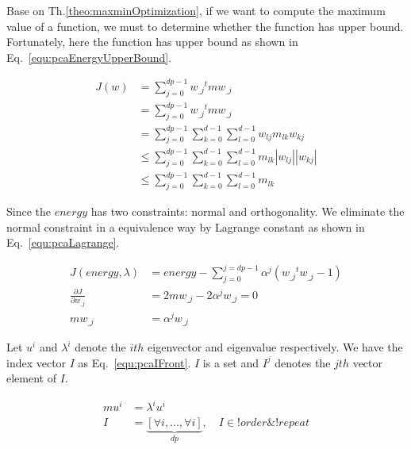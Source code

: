 \documentclass[runningheads,openany]{xhlPaper}
\begin{document}
Base on Th.\ref{theo:maxminOptimization}, if we want to compute the maximum value of a function, we must to determine whether the function has upper bound. Fortunately, here the function has upper bound as shown in Eq.~\ref{equ:pcaEnergyUpperBound}.

\begin{equation}
\label{equ:pcaEnergyUpperBound}
\begin{aligned}
J\left( w \right) &= \sum\limits_{j = 0}^{{dp} - 1} {{w_{\_j}}^tm{w_{\_j}}} \\
 &= \sum\limits_{j = 0}^{{dp} - 1} {{w_{\_j}}^tm{w_{\_j}}} \\
 &= \sum\limits_{j = 0}^{{dp} - 1} {\sum\limits_{k = 0}^{d - 1} {\sum\limits_{l = 0}^{d - 1} {{w_{lj}}{m_{lk}}{w_{kj}}} } } \\
 &\le \sum\limits_{j = 0}^{{dp} - 1} {\sum\limits_{k = 0}^{d - 1} {\sum\limits_{l = 0}^{d - 1} {{m_{lk}}|{w_{lj}}||{w_{kj}}|} } } \\
 &\le \sum\limits_{j = 0}^{{dp} - 1} {\sum\limits_{k = 0}^{d - 1} {\sum\limits_{l = 0}^{d - 1} {{m_{lk}}} } } 
\end{aligned}
\end{equation}

Since the $energy$ has two constraints: normal and orthogonality. We eliminate the normal constraint in a equivalence way by Lagrange constant as shown in Eq.~\ref{equ:pcaLagrange}.

\begin{equation}
\label{equ:pcaLagrange}
\begin{aligned}
J(energy,\lambda ) &= energy - \sum\limits_{j = 0}^{j = {dp} - 1} {{\alpha ^j}({w_{\_j}}^t{w_{\_j}} - 1)} \\
\frac{{\partial J}}{{\partial {w_{\_j}}}} &= 2m{w_{\_j}} - 2{\alpha  ^j}{w_{\_j}} = 0\\
m{w_{\_j}} &= {\alpha ^j}{w_{\_j}}
\end{aligned}
\end{equation}

Let $u^i$ and $\lambda ^i$ denote the $ith$ eigenvector and eigenvalue respectively. We have the index vector $I$ as Eq.~\ref{equ:pcaIFront}. $I$ is a set and $I^j$ denotes the $jth$ vector element of $I$.

\begin{equation}
\label{equ:pcaIFront}
\begin{aligned}
m{u^i} &= {\lambda ^i}{u^i}\\
I &= \underbrace {[\forall i,...,\forall i]}_{{dp}},\quad I \in !order\& !repeat\\
\end{aligned}
\end{equation}
\end{document}

